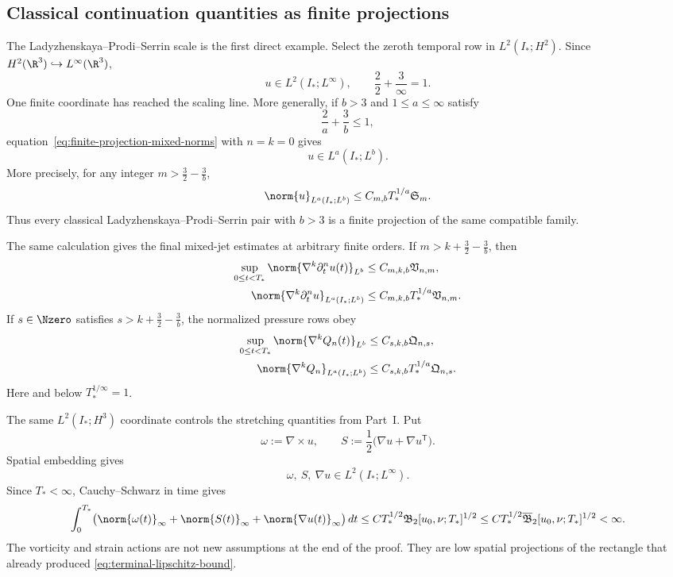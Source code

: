 \subsection{Classical continuation quantities as finite projections}

The Ladyzhenskaya--Prodi--Serrin scale is the first direct example.  Select the
zeroth temporal row in \(L^2(I_*;H^2)\).  Since
\(H^2(\R^3)\hookrightarrow L^\infty(\R^3)\),
\[
 u\in L^2(I_*;L^\infty),
 \qquad
 \frac22+\frac3\infty=1.
\]
One finite coordinate has reached the scaling line.  More generally, if
\(b>3\) and \(1\le a\le\infty\) satisfy
\[
 \frac2a+\frac3b\le1,
\]
equation~\eqref{eq:finite-projection-mixed-norms} with \(n=k=0\) gives
 \[
 u\in L^a(I_*;L^b).
 \]
More precisely, for any integer
\(m>\frac32-\frac3b\),
\begin{equation}
 \norm{u}_{L^a(I_*;L^b)}
 \le C_{m,b}T_*^{1/a}\mathfrak S_m.
 \label{eq:quantitative-lps-family}
\end{equation}
Thus every classical Ladyzhenskaya--Prodi--Serrin pair with \(b>3\) is a
finite projection of the same compatible family.

The same calculation gives the final mixed-jet estimates at arbitrary finite
orders.  If \(m>k+\frac32-\frac3b\), then
\begin{equation}
 \begin{aligned}
  \sup_{0\le t<T_*}
  \norm{\nabla^k\partial_t^n u(t)}_{L^b}
  &\le C_{m,k,b}\mathfrak V_{n,m},\\
  \norm{\nabla^k\partial_t^n u}_{L^a(I_*;L^b)}
  &\le C_{m,k,b}T_*^{1/a}\mathfrak V_{n,m}.
 \end{aligned}
 \label{eq:closed-mixed-jet-estimates}
\end{equation}
If \(s\in\Nzero\) satisfies
\(s>k+\frac32-\frac3b\), the normalized pressure rows obey
\begin{equation}
 \begin{aligned}
  \sup_{0\le t<T_*}\norm{\nabla^kQ_n(t)}_{L^b}
  &\le C_{s,k,b}\mathfrak Q_{n,s},\\
  \norm{\nabla^kQ_n}_{L^a(I_*;L^b)}
  &\le C_{s,k,b}T_*^{1/a}\mathfrak Q_{n,s}.
 \end{aligned}
 \label{eq:closed-pressure-jet-estimates}
\end{equation}
Here and below \(T_*^{1/\infty}=1\).

The same \(L^2(I_*;H^3)\) coordinate controls the stretching quantities from
Part~I.  Put
\[
 \omega:=\nabla\times u,
 \qquad
 S:=\frac12\bigl(\nabla u+\nabla u^{\mathsf T}\bigr).
\]
Spatial embedding gives
\[
 \omega,\ S,\ \nabla u\in L^2(I_*;L^\infty).
\]
Since \(T_*<\infty\), Cauchy--Schwarz in time gives
\begin{equation}
 \int_0^{T_*}
 \bigl(\norm{\omega(t)}_\infty+\norm{S(t)}_\infty
       +\norm{\nabla u(t)}_\infty\bigr)\,dt
 \le C T_*^{1/2}\mathfrak B_2[u_0,\nu;T_*]^{1/2}
 \le C T_*^{1/2}\overline{\mathfrak B}_2[u_0,\nu;T_*]^{1/2}<\infty.
 \label{eq:quantitative-stretching-actions}
\end{equation}
The vorticity and strain actions are not new assumptions at the end of the
proof.  They are low spatial projections of the rectangle that already
produced \eqref{eq:terminal-lipschitz-bound}.

